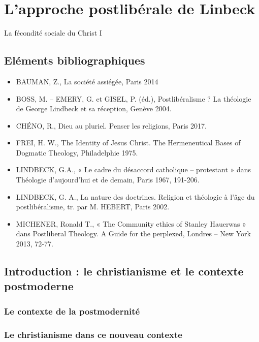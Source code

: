 \chapter{L’approche postlibérale de Linbeck}
La fécondité sociale du Christ I


\section{Eléments bibliographiques}

\begin{itemize}
    \item 
BAUMAN, Z., La société assiégée, Paris 2014
    \item BOSS, M. – EMERY, G. et GISEL, P. (éd.), Postlibéralisme ? La théologie de George Lindbeck
et sa réception, Genève 2004.
    \item CHÉNO, R., Dieu au pluriel. Penser les religions, Paris 2017.
    \item FREI, H. W., The Identity of Jesus Christ. The Hermeneutical Bases of Dogmatic Theology,
Philadelphie 1975.
    \item LINDBECK, G.A., « Le cadre du désaccord catholique – protestant » dans Théologie
d’aujourd’hui et de demain, Paris 1967, 191-206.
    \item LINDBECK, G. A., La nature des doctrines. Religion et théologie à l’âge du postlibéralisme,
tr. par M. HEBERT, Paris 2002.
    \item MICHENER, Ronald T., « The Community ethics of Stanley Hauerwas » dans Postliberal
Theology. A Guide for the perplexed, Londres – New York 2013, 72-77.
\end{itemize}


\section{Introduction : le christianisme et le contexte postmoderne}

\subsection{Le contexte de la postmodernité}
\subsection{Le christianisme dans ce nouveau contexte}
 
